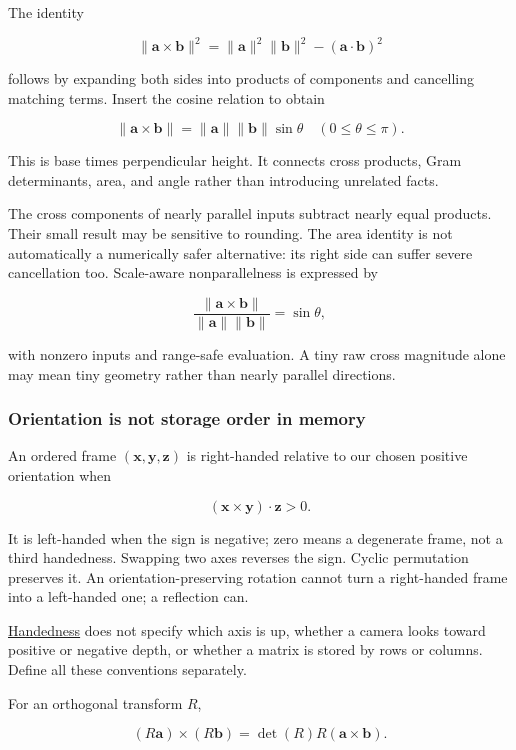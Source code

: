 The identity

\[
\|\mathbf a\times\mathbf b\|^2
=\|\mathbf a\|^2\|\mathbf b\|^2-(\mathbf a\cdot\mathbf b)^2
\]

follows by expanding both sides into products of components and cancelling matching terms. Insert the cosine relation to obtain

\[
\|\mathbf a\times\mathbf b\|=\|\mathbf a\|\|\mathbf b\|\sin\theta
\quad(0\le\theta\le\pi).
\]

This is base times perpendicular height. It connects cross products, Gram determinants, area, and angle rather than introducing unrelated facts.

The cross components of nearly parallel inputs subtract nearly equal products. Their small result may be sensitive to rounding. The area identity is not automatically a numerically safer alternative: its right side can suffer severe cancellation too. Scale-aware nonparallelness is expressed by

\[
\frac{\|\mathbf a\times\mathbf b\|}{\|\mathbf a\|\|\mathbf b\|}=\sin\theta,
\]

with nonzero inputs and range-safe evaluation. A tiny raw cross magnitude alone may mean tiny geometry rather than nearly parallel directions.

\subsubsection{Orientation is not storage order in memory}\label{orientation-is-not-storage-order-in-memory}

An ordered frame \((\mathbf x,\mathbf y,\mathbf z)\) is right-handed relative to our chosen positive orientation when

\[
(\mathbf x\times\mathbf y)\cdot\mathbf z>0.
\]

It is left-handed when the sign is negative; zero means a degenerate frame, not a third handedness. Swapping two axes reverses the sign. Cyclic permutation preserves it. An orientation-preserving rotation cannot turn a right-handed frame into a left-handed one; a reflection can.

\hyperref[01-foundations-i-ch017]{Handedness} does not specify which axis is up, whether a camera looks toward positive or negative depth, or whether a matrix is stored by rows or columns. Define all these conventions separately.

For an orthogonal transform \(R\),

\[
(R\mathbf a)\times(R\mathbf b)
=\det(R)R(\mathbf a\times\mathbf b).
\]

